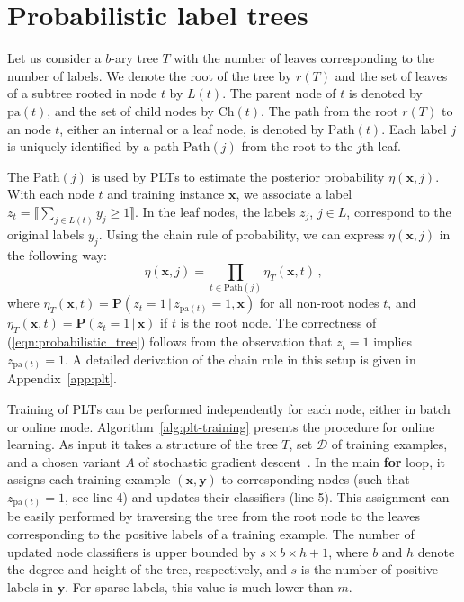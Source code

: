 \documentclass{article}
\newcommand{\Algo}[1]{\textsc{#1}}
\renewcommand{\vec}[1]{\boldsymbol{#1}}
\newcommand{\bx}{\vec{x}}
\newcommand{\by}{\vec{y}}
\newcommand{\calD}{\mathcal{D}}
\newcommand{\pa}[1]{\mathrm{pa}(#1)}
\newcommand{\Path}[1]{\mathrm{Path}(#1)}
\newcommand{\Children}[1]{\mathrm{Ch}(#1)}
\newcommand{\prob}{\mathbf{P}}
\newcommand{\assert}[1]{\llbracket #1 \rrbracket}
\newcommand{\given}{\, | \,}
\newcommand{\sectionBefore}{-0pt}
\newcommand{\sectionAfter}{-0pt}
\begin{document}
\vspace{\sectionBefore}
\section{Probabilistic label trees}
\vspace{\sectionAfter}

Let us consider a $b$-ary tree $T$ with the number of leaves corresponding to the number of labels. We denote the root of the tree by $r(T)$ and the set of leaves of a subtree rooted in node $t$ by $L(t)$. The parent node of $t$ is denoted by $\pa{t}$, and the set of child nodes by $\Children{t}$. The path from the root $r(T)$ to an node $t$, either an internal or a leaf node, is denoted by $\Path{t}$. 
%
Each label $j$ is uniquely identified by a path $\Path{j}$ from the root to the $j$\/th leaf. %

The $\Path{j}$ is used by \Algo{PLT}s to estimate the posterior probability $\eta(\bx, j)$.
With each node $t$ and training instance $\bx$, we associate a label $z_t = \assert{\textstyle \sum_{j \in L(t)} y_j \ge 1}$.
In the leaf nodes, the labels $z_j$, $j \in L$, correspond to the original labels $y_j$.
Using the chain rule of probability, we can express $\eta(\bx, j)$ in the following way:
\begin{equation}
\eta(\bx, j) = \prod_{t \in \Path{j}} \eta_T(\bx, t)\,,
\label{eqn:probabilistic_tree}
\end{equation}
where $\eta_T(\bx, t) = \prob(z_t = 1 \given z_{\pa{t}} =1, \bx)$ for all non-root nodes $t$, and $\eta_T(\bx, t) = \prob(z_t = 1 \given \bx)$ if $t$ is the root node. 
The correctness of (\ref{eqn:probabilistic_tree}) follows from the observation that $z_{t} = 1$ implies $z_{\pa{t}} = 1$. A detailed derivation of the chain rule in this setup is given in Appendix~\ref{app:plt}.

Training of \Algo{PLT}s can be performed independently for each node, either in batch or online mode.  Algorithm~\ref{alg:plt-training} presents the procedure for online learning. As input it takes a structure of the tree $T$, set $\calD$ of training examples, and a chosen variant $A$ of stochastic gradient descent~\cite{Bottou_2010}. In the main \textbf{for} loop, it assigns each training example $(\bx, \by)$ to corresponding nodes (such that  $z_{\pa{t}} = 1$, see line 4) and updates their classifiers (line 5). This assignment can be easily performed by traversing the tree from the root node to the leaves corresponding to the positive labels of a training example. The number of updated node classifiers is upper bounded by $s \times b \times h+1$, where $b$ and $h$ denote the degree and height of the tree, respectively, and $s$ is the number of positive labels in $\by$. For sparse labels, this value is much lower than $m$.
\end{document}
